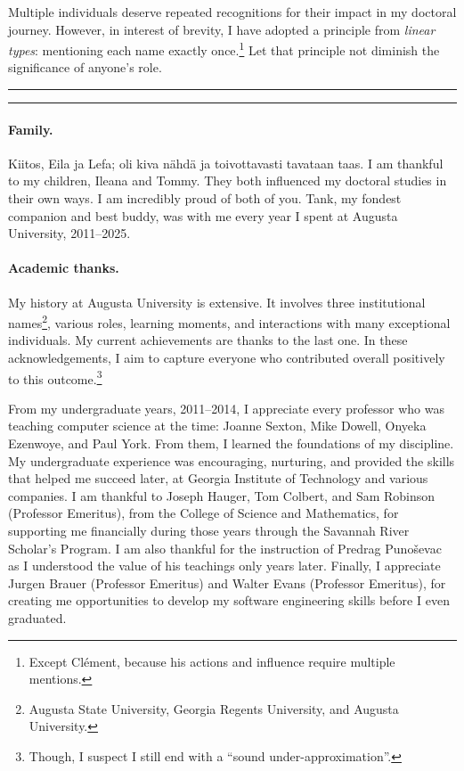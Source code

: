 Multiple individuals deserve repeated recognitions for their impact in my doctoral journey.
However, in interest of brevity, I have adopted a principle from \emph{linear types}: mentioning each name exactly once.\footnote{Except Clément, because his actions and influence require multiple mentions.}
Let that principle not diminish the significance of anyone's role. %

\noindent\hfil\rule{0.25\textwidth}{.4pt}\hspace{1em}\raisebox{-0.5\height}{\SixFlowerAltPetal}\hspace{1em}\rule{0.25\textwidth}{.4pt}\hfil

\paragraph*{Family.}
Kiitos, Eila ja Lefa; oli kiva nähdä ja toivottavasti tavataan taas.
I am thankful to my children, Ileana and Tommy.
They both influenced my doctoral studies in their own ways.
I am incredibly proud of both of you.
Tank, my fondest companion and best buddy, was with me every year I spent at Augusta University, 2011--2025.

\paragraph*{Academic thanks.}
My history at {Augusta University} is extensive.
It involves three institutional names\footnote{Augusta State University, Georgia Regents University, and Augusta University.},
various roles, learning moments, and interactions with many exceptional individuals.
My current achievements are thanks to the last one.
In these acknowledgements, I aim to capture everyone who contributed overall positively to this outcome.\footnote{Though, I suspect I still end with a \enquote{sound under-approximation}.}

From my undergraduate years, 2011--2014, I appreciate every professor who was teaching computer science at the time: Joanne Sexton, Mike Dowell, Onyeka Ezenwoye, and Paul York.
From them, I learned the foundations of my discipline.
My undergraduate experience was encouraging, nurturing, and provided the skills that helped me succeed later, at Georgia Institute of Technology and various companies.
I am thankful to Joseph Hauger, Tom Colbert, and Sam Robinson (Professor Emeritus), from the College of Science and Mathematics, for supporting me financially during those years through the Savannah River Scholar's Program.
I am also thankful for the instruction of Predrag Punoševac as I understood the value of his teachings only years later.
Finally, I appreciate Jurgen Brauer (Professor Emeritus) and Walter Evans (Professor Emeritus),
for creating me opportunities to develop my software engineering skills before I even graduated.

